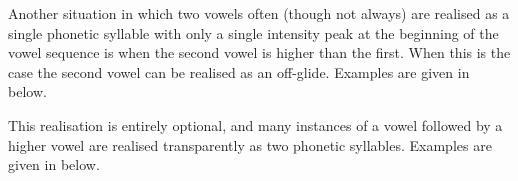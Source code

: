 \newpage
\begin{exe}
\end{exe}

Another situation in which two vowels often (though not always)
are realised as a single phonetic syllable with only a single intensity peak
at the beginning of the vowel sequence is when the second vowel
is higher than the first.
When this is the case the second vowel can be realised as an off-glide.
Examples are given in  below.

\begin{exe}
	\label{ex:VVSyl}
\end{exe}

This realisation is entirely optional,
and many instances of a vowel followed by a higher vowel are
realised transparently as two phonetic syllables.
Examples are given in  below.

